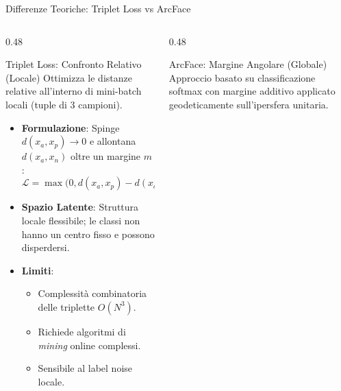 \documentclass[aspectratio=169, 10pt]{beamer}
\begin{document}
\begin{frame}{Differenze Teoriche: Triplet Loss vs ArcFace}
\begin{columns}[T, onlytextwidth]

\begin{column}{0.48\textwidth}
    \begin{block}{\small Triplet Loss: Confronto Relativo (Locale)}
        \scriptsize
        Ottimizza le distanze relative all'interno di mini-batch locali (tuple di 3 campioni).
    \end{block}

    \smallskip
    \begin{itemize}
        \setlength{\itemsep}{2pt}
        \setlength{\parskip}{0pt}
        \scriptsize
        \item \textbf{Formulazione}: Spinge $d(x_a, x_p) \to 0$ e allontana $d(x_a, x_n)$ oltre un margine $m$:
        \[
          \mathcal{L} = \max\!\bigl(0, d(x_a,x_p) - d(x_a,x_n) + m\bigr)
        \]
        \item \textbf{Spazio Latente}: Struttura locale flessibile; le classi non hanno un centro fisso e possono disperdersi.
        \item \textbf{Limiti}:
            \begin{itemize}
                \scriptsize
                \item Complessità combinatoria delle triplette $O(N^3)$.
                \item Richiede algoritmi di \emph{mining} online complessi.
                \item Sensibile al label noise locale.
            \end{itemize}
    \end{itemize}
\end{column}

\begin{column}{0.48\textwidth}
    \begin{block}{\small ArcFace: Margine Angolare (Globale)}
        \scriptsize
        Approccio basato su classificazione softmax con margine additivo applicato geodeticamente sull'ipersfera unitaria.
    \end{block}


\end{column}
\end{columns}
\end{frame}
\end{document}
